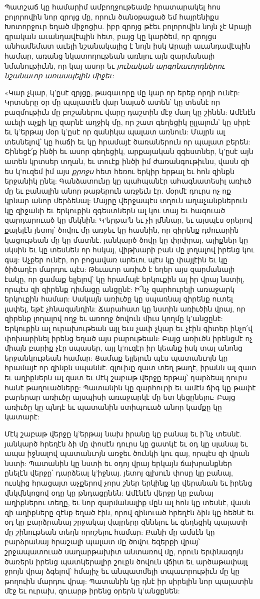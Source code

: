 \documentclass{article}
\begin{document}
{Պատշաճ կը համարիմ ամբողջութեամբ հրատարակել հոս բոլորովին նոր զրոյց մը, որուն ծանօթացած եմ հայրենիքս Խոտորջուր եղած միջոցիս. իբր զրոյց թէեւ բոլորովին նոյն չէ Արայի գրական աւանդավէպին հետ, բայց կը կարծեմ, որ զրոյցս անհամեմատ աւելի նշանակալից է նոյն իսկ Արայի աւանդավէպին համար, առանց նկատողութեան առնլու այն զարմանալի նմանութիւնն, որ կայ ասոր եւ \emph{յունական արգոնաւորդներու նշանաւոր առասպելին միջեւ}:

«Կար չկար, կ'ըսէ զրյցը, թագաւորը մը կար որ երեք որդի ունէր: Կրտսերը օր մը պալատէն վար նայած ատեն՝ կը տեսնէ որ բազմութիւն մը բոշաներու վարը դաշտին մէջ մաղ կը շինեն: Ամէնէն աւելի աչքի կը զարնէ աղջիկ մը, որ շատ գեղեցիկ ըլլալուն՝ կը սիրէ եւ կ'երթայ մօր կ'ըսէ որ զանիկա պալատ առնուն: Մայրն ալ տեսնելով՝ կը հաճի եւ կը հրամայէ ծառաներուն որ պալատ բերեն: Շինեցէ՛ք ինծի եւ ասոր գեղեցիկ, արքայական զգեստներ, կ'ըսէ այն ատեն կրտսեր տղան, եւ տուէք ինծի իմ ժառանգութիւնս, վասն զի ես կ'ուզեմ իմ այս \emph{քրոջս} հետ հեռու երկիր երթալ եւ հոն զինքն երջանիկ ընել: Գանձատունը կը պահպանէր ահագնատեսիլ առիւծ մը եւ բանալին անոր թաթերուն առջեւն էր. մօրմէ դուրս ոչ ոք կրնար անոր մերձենալ: Մայրը վերջապէս տղուն աղաչանքներուն կը զիջանի եւ երկուքին զգեստներն ալ կու տայ եւ հագուած զարդարուած կը մեկնին: Կ'երթա'ն եւ չի լմննար, եւ այսպէս օրերով քալելէն յետոյ՝ ծովու մը առջեւ կը հասնին, որ զիրենք դժուարին կացութեան մը կը մատնէ. յանկարծ ծովը կը փրփրայ, ալիքներ կը սկսին եւ կը տեսնեն որ հսկայ, վիթխարի բան մը լողալով իրենց կու գայ: Աչքեր ունէր, որ բոցավառ արեւու պէս կը փայլէին եւ կը ծիծաղէր մարդու պէս: Թեւաւոր առիւծ է եղեր այս զարմանալի էակը, որ ցամաք ելլելով՝ կը հրամայէ երկուքին ալ իր վրայ նստիլ, որպէս զի զիրենք դիմացը անցընէ: Ի՜նչ զարհուրելի առաջարկ երկուքին համար: Սակայն առիւծը կը սպառնայ զիրենք ուտել լափել, եթէ չհնազանդին: Ճարահատ կը նստին առիւծին վրայ, որ զիրենք լողալով ողջ եւ առողջ ծովուն միւս կողմը կ'անցընէ: Երկուքին ալ ուրախութեան այլ եւս չափ չկար եւ չէին գիտեր ինչո՛վ փոխարինել իրենց եղած այս բարութեան: Բայց առիւծն իրենցմէ ոչ միայն բարիք չէր սպասեր, այլ կ'ուզէր իր կեանք իսկ տալ անոնց երջանկութեան համար: Ցամաք ելլելուն պէս պատանւոյն կը հրամայէ որ զինքն սպաննէ. գլուխը զատ տեղ թաղէ, իրանն ալ զատ եւ աղիքներն ալ զատ եւ մէկ շաբաթ վերջը երթայ՝ դարձեալ դուրս հանէ թաղուածները: Պատանին կը զարհուրի եւ ամէն ճիգ կը թափէ բարերար առիւծը այսպիսի առաջարկէ մը ետ կեցընելու: Բայց առիւծը կը պնդէ եւ պատանին ստիպուած անոր կամքը կը կատարէ:

Մէկ շաբաթ վերջը կ'երթայ նախ իրանը կը բանայ եւ ի՛նչ տեսնէ. յանկարծ հրեղէն ձի մը փոսէն դուրս կը ցատկէ եւ օդ կը սլանայ եւ ապա իջնալով պատանւոյն առջեւ ծունկի կու գայ, որպէս զի վրան նստի: Պատանին կը նստի եւ օդոյ վրայ երկայն ճախրանքներ ընելէն վերջը՝ դարձեալ կ'իջնայ. յետոյ գլխուն փոսը կը բանայ, ուսկից հրացայտ աչքերով չորս շներ երկինք կը վերանան եւ իրենց վնկվնկոցով օդը կը թնդացընեն: Ամէնէն վերջը կը բանայ աղիքներու տեղը, եւ նոր զարմանալիք մըն ալ հոն կը տեսնէ, վասն զի աղիքները զէնք եղած էին, որով զինուած հրեղէն ձին կը հեծնէ եւ օդ կը բարձրանայ շրջակայ վայրերը զննելու եւ գեղեցիկ պալատի մը շինութեան տեղն որոշելու համար: Քանի մը ամսէն կը բարձրանայ հրաշալի պալատ մը ծովու եզերքի վրայ՝ շրջապատուած սաղարթախիտ անտառով մը, որուն երփնագոյն ծառերն իրենց պատկերալիր շուքն ծովուն վճիտ եւ արծաթափայլ ջրոյն վրայ ձգելով՝ հմայիչ եւ անպատմելի տպաւորութիւն մը կը թողուին մարդու վրայ: Պատանին կը դնէ իր սիրելին նոր պալատին մէջ եւ ուրախ, զուարթ իրենց օրերն կ'անցընեն:

}
\end{document}
